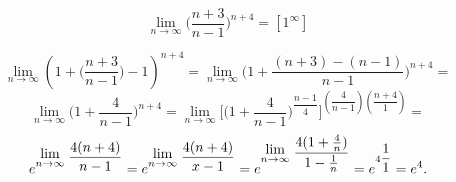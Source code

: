 {}

$$
  \lim_{n\to\infty} \big(\dfrac{n+3}{n-1}\big)^{n+4} = [1^\infty]
$$

$$
  \lim_{n\to\infty} (1+\big(\dfrac{n+3}{n-1}\big)-1)^{n+4} =
  \lim_{n\to\infty} \big(1+ \dfrac{(n+3)-(n-1)}{n-1}\big)^{n+4} =
$$
$$
  \lim_{n\to\infty} \big(1+\dfrac{4}{n-1}\big)^{n+4} =
  \lim_{n\to\infty} \Bigg[ \big(1+\dfrac{4}{n-1}\big)^{\dfrac{n-1}{4}} \Bigg]^{(\dfrac{4}{n-1})(\dfrac{n+4}{1})} =
$$
$$
  e^{\Lim{n\to{\infty}}\dfrac{4(n+4)}{n-1}} =
  e^{\Lim{n\to{\infty}}\dfrac{4(n+4)}{x-1}} =
  e^{\Lim{n\to{\infty}}\dfrac{4(1+\frac{4}{n})}{1-\frac{1}{n}}} =
  e^{4\dfrac{1}{1}} =
  e^4.
$$
